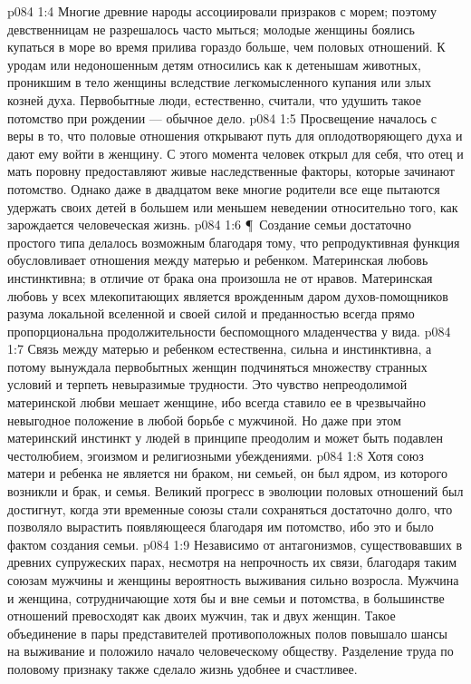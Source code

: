 \vs p084 1:4 Многие древние народы ассоциировали призраков с морем; поэтому девственницам не разрешалось часто мыться; молодые женщины боялись купаться в море во время прилива гораздо больше, чем половых отношений. К уродам или недоношенным детям относились как к детенышам животных, проникшим в тело женщины вследствие легкомысленного купания или злых козней духа. Первобытные люди, естественно, считали, что удушить такое потомство при рождении --- обычное дело.
\vs p084 1:5 Просвещение началось с веры в то, что половые отношения открывают путь для оплодотворяющего духа и дают ему войти в женщину. С этого момента человек открыл для себя, что отец и мать поровну предоставляют живые наследственные факторы, которые зачинают потомство. Однако даже в двадцатом веке многие родители все еще пытаются удержать своих детей в большем или меньшем неведении относительно того, как зарождается человеческая жизнь.
\vs p084 1:6 \P\ Создание семьи достаточно простого типа делалось возможным благодаря тому, что репродуктивная функция обусловливает отношения между матерью и ребенком. Материнская любовь инстинктивна; в отличие от брака она произошла не от нравов. Материнская любовь у всех млекопитающих является врожденным даром духов\hyp{}помощников разума локальной вселенной и своей силой и преданностью всегда прямо пропорциональна продолжительности беспомощного младенчества у вида.
\vs p084 1:7 Связь между матерью и ребенком естественна, сильна и инстинктивна, а потому вынуждала первобытных женщин подчиняться множеству странных условий и терпеть невыразимые трудности. Это чувство непреодолимой материнской любви мешает женщине, ибо всегда ставило ее в чрезвычайно невыгодное положение в любой борьбе с мужчиной. Но даже при этом материнский инстинкт у людей в принципе преодолим и может быть подавлен честолюбием, эгоизмом и религиозными убеждениями.
\vs p084 1:8 Хотя союз матери и ребенка не является ни браком, ни семьей, он был ядром, из которого возникли и брак, и семья. Великий прогресс в эволюции половых отношений был достигнут, когда эти временные союзы стали сохраняться достаточно долго, что позволяло вырастить появляющееся благодаря им потомство, ибо это и было фактом создания семьи.
\vs p084 1:9 Независимо от антагонизмов, существовавших в древних супружеских парах, несмотря на непрочность их связи, благодаря таким союзам мужчины и женщины вероятность выживания сильно возросла. Мужчина и женщина, сотрудничающие хотя бы и вне семьи и потомства, в большинстве отношений превосходят как двоих мужчин, так и двух женщин. Такое объединение в пары представителей противоположных полов повышало шансы на выживание и положило начало человеческому обществу. Разделение труда по половому признаку также сделало жизнь удобнее и счастливее.
